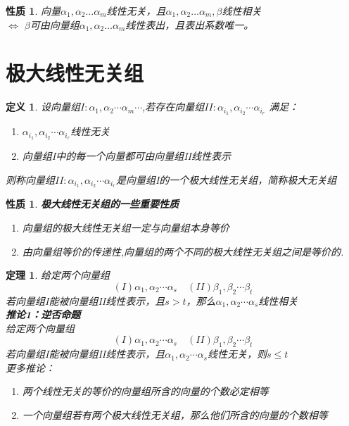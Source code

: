 \documentclass[12pt,oneside]{ctexbook}
\newtheorem{definition}[subsection]{定义}
\newtheorem{theorem}[subsection]{定理}
\newtheorem{property}[subsection]{性质}
\begin{document}
\begin{property}
    向量\(\alpha_1,\alpha_2 \dots \alpha_m\)线性无关，且\(\alpha_1,\alpha_2 \dots \alpha_m , \beta\)线性相关
    \\ \(\Leftrightarrow\) \(\beta\)可由向量组\(\alpha_1,\alpha_2 \dots \alpha_m\)线性表出，且表出系数唯一。
\end{property}
\section{极大线性无关组}
\begin{definition}
    设向量组\(I: \alpha_1,\alpha_2 \cdots \alpha_m \cdots\),若存在向量组\(II: \alpha_{i_1},\alpha_{i_2} \cdots \alpha_{i_r}\)
    满足：
    \begin{enumerate}
        \item \(\alpha_{i_1},\alpha_{i_2} \cdots \alpha_{i_r}\)线性无关
        \item 向量组I中的每一个向量都可由向量组II线性表示
    \end{enumerate}
    则称向量组\(II: \alpha_{i_1},\alpha_{i_2} \cdots \alpha_{i_r}\)是向量组I的一个极大线性无关组，简称极大无关组
\end{definition}
\begin{property}
    \textbf{极大线性无关组的一些重要性质}
    \begin{enumerate}
        \item 向量组的极大线性无关组一定与向量组本身等价
        \item 由向量组等价的传递性,向量组的两个不同的极大线性无关组之间是等价的.
    \end{enumerate}
\end{property}
\begin{theorem}
    给定两个向量组
    \[(I)\alpha_1,\alpha_2 \cdots \alpha_s \quad (II) \beta_1,\beta_2 \cdots \beta_t \]
    若向量组I能被向量组II线性表示，且\(s>t\)，那么\(\alpha_1,\alpha_2 \cdots \alpha_s\)线性相关
    \\ \textbf{推论1：逆否命题}
    \\给定两个向量组
    \[(I)\alpha_1,\alpha_2 \cdots \alpha_s \quad (II) \beta_1,\beta_2 \cdots \beta_t \]
    若向量组I能被向量组II线性表示，且\(\alpha_1,\alpha_2 \cdots \alpha_s\)线性无关，则\(s \leq t\)
    \\更多推论：
    \begin{enumerate}
        \item 两个线性无关的等价的向量组所含的向量的个数必定相等
        \item 一个向量组若有两个极大线性无关组，那么他们所含的向量的个数相等
    \end{enumerate}
\end{theorem}
\end{document}

